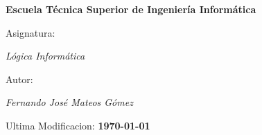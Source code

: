 \begin{titlepage}
        \centering
        {\bfseries\LARGE Escuela Técnica Superior de Ingeniería Informática \par}
        \vspace{1cm}
        {\Large Asignatura: \par \textit{Lógica Informática} \par}
        \vspace{1cm}
        {\Large Autor: \par \textit{Fernando José Mateos Gómez} \par}
        \vspace{2cm}
        {\Large Ultima Modificacion: \textbf{\today} \par}
        \vspace{2cm}
\end{titlepage}
\restoregeometry